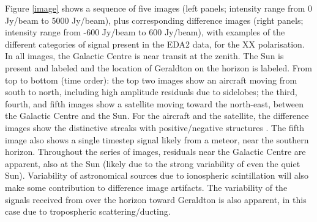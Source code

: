 Figure \ref{image} shows a sequence of five images (left panels; intensity range from 0 Jy/beam to 5000 Jy/beam), plus corresponding difference images (right panels; intensity range from -600 Jy/beam to 600 Jy/beam), with examples of the different categories of signal present in the EDA2 data, for the XX polarisation.  In all images, the Galactic Centre is near transit at the zenith.  The Sun is present and labeled and the location of Geraldton on the horizon is labeled.  From top to bottom (time order): the top two images show an aircraft moving from south to north, including high amplitude residuals due to sidelobes; the third, fourth, and fifth images show a satellite moving toward the north-east, between the Galactic Centre and the Sun.  For the aircraft and the satellite, the difference images show the distinctive streaks with positive/negative structures \citep{2020arXiv200201674P}.  The fifth image also shows a single timestep signal likely from a meteor, near the southern horizon.  Throughout the series of images, residuals near the Galactic Centre are apparent, also at the Sun (likely due to the strong variability of even the quiet Sun).  Variability of astronomical sources due to ionospheric scintillation will also make some contribution to difference image artifacts.  The variability of the signals received from over the horizon toward Geraldton is also apparent, in this case due to tropospheric scattering/ducting.

